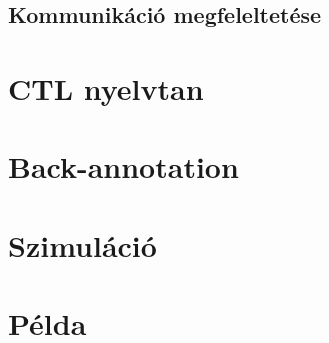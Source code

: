 \subsection{Kommunikáció megfeleltetése}

\section{CTL nyelvtan}

\section{Back-annotation}

\section{Szimuláció}

\section{Példa} %